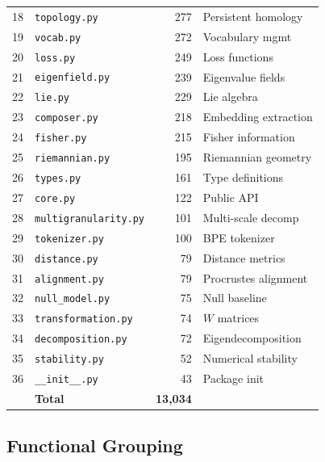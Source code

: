 \documentclass[11pt,a4paper]{article}
\begin{document}
\begin{longtable}{@{}rlrl@{}}
18 & \texttt{topology.py} & 277 & Persistent homology \\
19 & \texttt{vocab.py} & 272 & Vocabulary mgmt \\
20 & \texttt{loss.py} & 249 & Loss functions \\
21 & \texttt{eigenfield.py} & 239 & Eigenvalue fields \\
22 & \texttt{lie.py} & 229 & Lie algebra \\
23 & \texttt{composer.py} & 218 & Embedding extraction \\
24 & \texttt{fisher.py} & 215 & Fisher information \\
25 & \texttt{riemannian.py} & 195 & Riemannian geometry \\
26 & \texttt{types.py} & 161 & Type definitions \\
27 & \texttt{core.py} & 122 & Public API \\
28 & \texttt{multigranularity.py} & 101 & Multi-scale decomp \\
29 & \texttt{tokenizer.py} & 100 & BPE tokenizer \\
30 & \texttt{distance.py} & 79 & Distance metrics \\
31 & \texttt{alignment.py} & 79 & Procrustes alignment \\
32 & \texttt{null\_model.py} & 75 & Null baseline \\
33 & \texttt{transformation.py} & 74 & $W$ matrices \\
34 & \texttt{decomposition.py} & 72 & Eigendecomposition \\
35 & \texttt{stability.py} & 52 & Numerical stability \\
36 & \texttt{\_\_init\_\_.py} & 43 & Package init \\
\midrule
& \textbf{Total} & \textbf{13{,}034} & \\
\bottomrule
\end{longtable}

\subsection{Functional Grouping}
\end{document}
